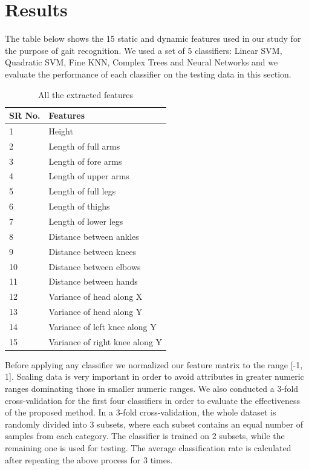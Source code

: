 \chapter{Results} \label{Results}

\noindent The table below shows the 15 static and dynamic features used in our study for the purpose of gait recognition. We used a set of 5 classifiers: Linear SVM, Quadratic SVM, Fine KNN, Complex Trees and Neural Networks and we evaluate the performance of each classifier on the testing data in this section.
 

\def\arraystretch{1.28}
\begin{table}[h]
\centering
\begin{tabular}{| p{2cm} | |p{6cm}|}
 \hline
\cellcolor{pink} SR No. & \cellcolor{pink} Features  \\ \hline
1 & Height \\ \hline
2 & Length of full arms \\ \hline
3 & Length of fore arms \\\hline
4 & Length of upper arms \\ \hline
5 & Length of full legs \\ \hline
6 & Length of thighs \\\hline
7 & Length of lower legs \\\hline
8 & Distance between ankles  \\ \hline
9 & Distance between knees \\ \hline
10 & Distance between elbows  \\ \hline
11 & Distance between hands  \\ \hline
12 & Variance of head along X   \\ \hline
13 & Variance of head along Y  \\ \hline
14 & Variance of left knee along Y  \\ \hline
15 & Variance of right knee along Y  \\ \hline
\end{tabular}
\caption{ All the extracted features}
\end{table}


\noindent Before applying any classifier we normalized our feature matrix to the range [-1, 1]. Scaling data is very important in order to avoid attributes in greater numeric ranges dominating those in smaller numeric ranges. We also conducted a 3-fold cross-validation for the first four classifiers in order to evaluate the effectiveness of the proposed method. In a 3-fold cross-validation, the whole dataset is randomly divided into 3 subsets, where each subset contains an equal number of samples from each category. The classifier is trained on 2 subsets, while the remaining one is used for testing. The average classification rate is calculated after repeating the above process for 3 times.

